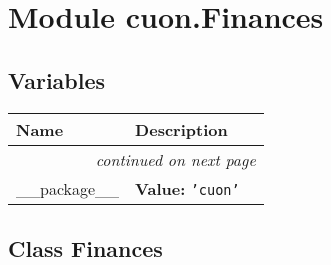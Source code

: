 %
%
%


\section{Module cuon.Finances}

    \label{cuon:Finances}


  \subsection{Variables}

    \vspace{-1cm}
\hspace{\varindent}\begin{longtable}{|p{\varnamewidth}|p{\vardescrwidth}|l}
\cline{1-2}
\cline{1-2} \centering \textbf{Name} & \centering \textbf{Description}& \\
\cline{1-2}
\endhead\cline{1-2}\multicolumn{3}{r}{\small\textit{continued on next page}}\\\endfoot\cline{1-2}
\endlastfoot\raggedright \_\-\_\-p\-a\-c\-k\-a\-g\-e\-\_\-\_\- & \raggedright \textbf{Value:} 
{\tt \texttt{'}\texttt{cuon}\texttt{'}}&\\
\cline{1-2}
\end{longtable}



\subsection{Class Finances}

